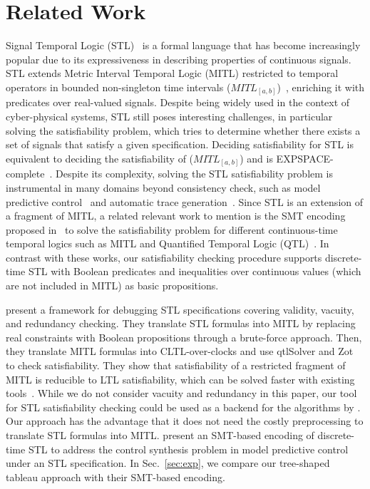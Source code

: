 \documentclass[acmsmall,screen]{acmart}
\begin{document}
\section{Related Work}
\label{sec:rw}
Signal Temporal Logic (STL)~\cite{MalerN04} is a formal language that has become increasingly popular due to its expressiveness in describing properties of continuous signals.
STL extends Metric Interval Temporal Logic (MITL) restricted to temporal operators in bounded non-singleton time intervals ($MITL_{[a,b]}$)~\cite{AlurFH96}, enriching it with predicates over real-valued signals.
Despite being widely used in the context of cyber-physical systems, STL still poses interesting challenges, in particular solving the satisfiability problem, which tries to determine whether there exists a set of signals that satisfy a given specification.
Deciding satisfiability for STL is equivalent to deciding the satisfiability of ($MITL_{[a,b]}$) and is EXPSPACE-complete~\cite{AlurH93}.
Despite its complexity, solving the STL satisfiability problem is instrumental in many domains beyond consistency check, such as model predictive control~\cite{RamanDMMSS14} and automatic trace generation~\cite{PrabhakarLK18}. Since STL is an extension of a fragment of MITL, a related relevant work to mention is the SMT encoding proposed in~\cite{BersaniRP15,BersaniRP16} to solve the satisfiability problem for different continuous-time temporal logics such as MITL and Quantified Temporal Logic (QTL)~\cite{HirshfeldR05}.  In contrast with these works, our satisfiability checking procedure supports discrete-time STL with Boolean predicates and inequalities over continuous values (which are not included in MITL) as basic propositions.

\citet{Dokhanchi} present a framework for debugging STL specifications
covering validity, vacuity, and redundancy checking.
They translate STL formulas into MITL by replacing real constraints with Boolean propositions through a brute-force approach.
Then, they translate MITL formulas into CLTL-over-clocks and use qtlSolver and Zot~\cite{BersaniRP13} to check satisfiability.
They show that satisfiability of a restricted fragment of MITL is reducible to LTL satisfiability, which can be solved faster with existing tools~\cite{CimattiCGGPRST02,RozierV10}.
While we do not consider vacuity and redundancy in this paper,
our tool for STL satisfiability checking could be used as a backend for the algorithms by \citet{Dokhanchi}.
Our approach has the advantage that it does not need the costly preprocessing to translate STL formulas into MITL.
\citet{RamanDMMSS14} present an SMT-based encoding of discrete-time STL to address the control synthesis problem in model predictive control under an STL specification.
In Sec.~\ref{sec:exp}, we compare our tree-shaped tableau approach with their SMT-based encoding.
\end{document}
